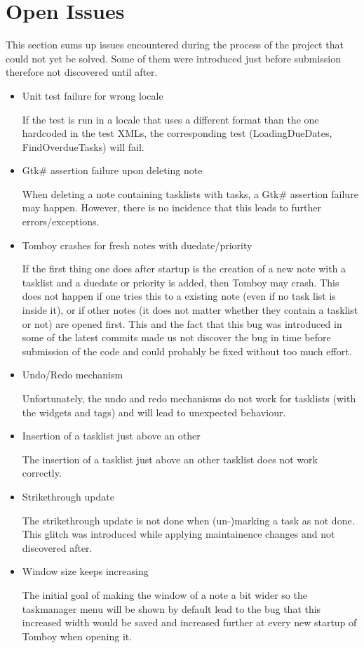 \section{Open Issues}
\label{issues}

This section sums up issues encountered during the process of the project that could not yet be solved.
Some of them were introduced just before submission therefore not discovered until after.

\begin{itemize}
\item Unit test failure for wrong locale

  If the test is run in a locale that uses a different format than the one hardcoded in the test XMLs, the corresponding test (LoadingDueDates, FindOverdueTasks) will fail.

\item Gtk\# assertion failure upon deleting note

  When deleting a note containing tasklists with tasks, a Gtk\# assertion failure may happen.
  However, there is no incidence that this leads to further errors/exceptions.

\item Tomboy crashes for fresh notes with duedate/priority

  If the first thing one does after startup is the creation of a new note with a tasklist and a duedate or priority is added, then Tomboy may crash. This does not happen if one tries this to a existing note (even if no task list is inside it), or if other notes (it does not matter whether they contain a tasklist or not) are opened first. 
This and the fact that this bug was introduced in some of the latest commits made us not discover the bug in time before submission of the code and could probably be fixed without too much effort.

\item Undo/Redo mechanism

  Unfortunately, the undo and redo mechanisms do not work for tasklists (with the widgets and tags) and will lead to unexpected behaviour.

\item Insertion of a tasklist just above an other

  The insertion of a tasklist just above an other tasklist does not work correctly.

\item Strikethrough update
  
  The strikethrough update is not done when (un-)marking a task as not done.
  This glitch was introduced while applying maintainence changes and not discovered after.

\item Window size keeps increasing

  The initial goal of making the window of a note a bit wider so the taskmanager menu will be shown by default lead to the bug that this increased width would be saved and increased further at every new startup of Tomboy when opening it.

\end{itemize}